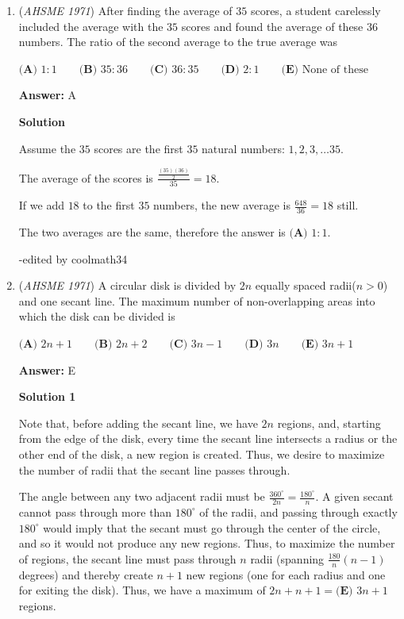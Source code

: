 \begin{enumerate}
 


	\item (\textit{AHSME 1971}) After finding the average of $35$ scores, a student carelessly included the average with the $35$ scores and found the 
average of these $36$ numbers. The ratio of the second average to the true average was


 $\textbf{(A) }1:1\qquad \textbf{(B) }35:36\qquad \textbf{(C) }36:35\qquad \textbf{(D) }2:1\qquad  \textbf{(E) }\text{None of these}$

 \textbf{Answer: }A



\textbf{Solution}

Assume the $35$ scores are the first $35$ natural numbers: $1, 2, 3, \dots 35.$

 The average of the scores is $\frac{\frac{(35)(36)}{2}}{35} = 18.$ 

 If we add $18$ to the first $35$ numbers, the new average is $\frac{648}{36} = 18$ still.

 The two averages are the same, therefore the answer is $\boxed{\textbf{(A) }1:1}.$

 -edited by coolmath34

 


	\item (\textit{AHSME 1971}) A circular disk is divided by $2n$ equally spaced radii($n>0$) and one secant line. The maximum number of non-overlapping 
areas into which the disk can be divided is


 $\textbf{(A) }2n+1\qquad \textbf{(B) }2n+2\qquad \textbf{(C) }3n-1\qquad \textbf{(D) }3n\qquad  \textbf{(E) }3n+1$

 \textbf{Answer: }E



\textbf{Solution 1}

Note that, before adding the secant line, we have $2n$ regions, and, starting from the edge of the disk, every time the secant line intersects a radius or the other end of the disk, a new region is created. Thus, we desire to maximize the number of radii that the secant line passes through.

 The angle between any two adjacent radii must be $\frac{360^{\circ}}{2n}=\frac{180^{\circ}}n$. A given secant cannot pass through more than $180^{\circ}$ of the radii, and passing through exactly $180^{\circ}$ would imply that the secant must go through the center of the circle, and so it would not produce any new regions. Thus, to maximize the number of regions, the secant line must pass through $n$ radii (spanning $\frac{180}n(n-1)$ degrees) and thereby create $n+1$ new regions (one for each radius and one for exiting the disk). Thus, we have a maximum of $2n+n+1=\boxed{\textbf{(E) }3n+1}$ regions.


\end{enumerate}
